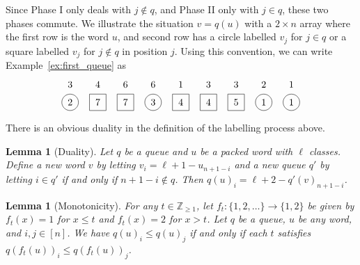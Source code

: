 \documentclass[submission]{FPSAC2018}
\DeclareMathOperator{\inter}{int} %
\newcommand{\ZZ}{\mathbb{Z}}
\newcommand{\ive}[1]{\left[ #1 \right]}
\theoremstyle{plain}
\newtheorem{lemma}[thm]{Lemma}
\theoremstyle{definition}
\newtheorem{remark}[thm]{Remark}
\numberwithin{equation}{section}
\begin{document}
Since Phase I only deals with $j \notin q$, and Phase II only with $j\in q$, these two phases commute.
We illustrate the situation $v = q(u)$ with a $2 \times n$ array where the first row is the word $u$, and second row has a circle labelled $v_j$ for $j \in q$ or a square labelled $v_j$ for $j \notin q$ in position $j$.
Using this convention, we can write Example~\ref{ex:first_queue} as
\[
\begin{tikzpicture}[baseline=10]
  \def\ll{0.65}   %
  \foreach \i in {5,9} { \node at (\i,\ll) {$1$}; }
  \foreach \i in {8} { \node at (\i,\ll) {$2$}; }
  \foreach \i in {1,6,7} { \node at (\i,\ll) {$3$}; }
  \foreach \i in {2} { \node at (\i,\ll) {$4$}; }
  \foreach \i in {3,4} { \node at (\i,\ll) {$6$}; }
  \foreach \i in {1,4,8,9} { \draw (\i,0) circle (0.3); }
  \foreach \i in {2,3,5,6,7} { \draw (\i-.3,0-.3) rectangle +(0.6,+0.6); }
  \foreach \i in {8,9} { \node at (\i,0) {$1$}; }
  \foreach \i in {1} { \node at (\i,0) {$2$}; }
  \foreach \i in {4} { \node at (\i,0) {$3$}; }
  \foreach \i in {5,6} { \node at (\i,0) {$4$}; }
  \foreach \i in {7} { \node at (\i,0) {$5$}; }
  \foreach \i in {2,3} { \node at (\i,0) {$7$}; }
\end{tikzpicture}
\]

There is an obvious duality in the definition of the labelling process above.

\begin{lemma}[Duality]
  Let $q$ be a queue and $u$ be a packed word with $\ell$ classes.
  Define a new word $v$ by letting $v_i = \ell + 1 - u_{n+1-i}$ and a new queue $q'$ by letting $i \in q'$ if and only if $n+1-i \notin q$.
 Then $q(u)_i = \ell + 2 - q'(v)_{n+1-i}$.
\end{lemma}


\begin{lemma}[Monotonicity]
\label{le:mono}
  For any $t \in \ZZ_{\geq 1}$, let $f_t \colon \{1,2, \ldots\} \to \{1,2\}$ be given by $f_t(x) = 1$ for $x \leq t$ and $f_t(x) = 2$ for $x > t$.
  Let $q$ be a queue, $u$ be any word, and $i,j \in \ive{n}$.
  We have $q(u)_i \leq q(u)_j$ if and only if each $t$ satisfies $q(f_t(u))_i \leq q(f_t(u))_j$.
\end{lemma}
\end{document}
